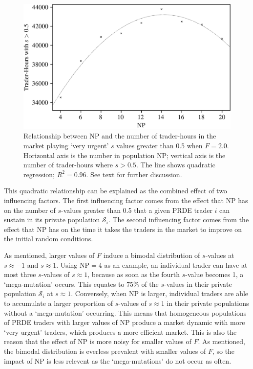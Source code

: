 \documentclass[conference]{IEEEtran}
\begin{document}
\begin{figure}[htbp]
    \centerline{\includegraphics[width=\columnwidth]{f=2.0_strats.png}}
    \caption{
        Relationship between $\mathrm{NP}$ and the number of trader-hours in the market playing `very urgent' $s$ values greater than 0.5 when $F=2.0$.
        Horizontal axis is the number in population $\mathrm{NP}$; vertical axis is the number of trader-hours where $s>0.5$.
        The line shows quadratic regression; $R^2=0.96$.
        See text for further discussion.
    }
    \label{F=2.0_strats}
\end{figure}

This quadratic relationship can be explained as the combined effect of two influencing factors.
The first influencing factor comes from the effect that $\mathrm{NP}$ has on the number of $s$-values greater than 0.5 that a given PRDE trader $i$ can sustain in its private population $\mathcal{S}_i$.
The second influencing factor comes from the effect that $\mathrm{NP}$ has on the time it takes the traders in the market to improve on the initial random conditions.

As mentioned, larger values of $F$ induce a bimodal distribution of $s$-values at $s\approx -1$ and $s\approx 1$.
Using $\mathrm{NP}=\mathrm{4}$ as an example, an individual trader can have at most three $s$-values of $s\approx 1$, because as soon as the fourth $s$-value becomes 1, a `mega-mutation' occurs.
This equates to 75\% of the $s$-values in their private population $\mathcal{S}_i$ at $s\approx 1$.
Conversely, when $\mathrm{NP}$ is larger, individual traders are able to accumulate a larger proportion of $s$-values of $s\approx 1$ in their private populations without a `mega-mutation' occurring.
This means that homogeneous populations of PRDE traders with larger values of $\mathrm{NP}$ produce a market dynamic with more `very urgent' traders, which produces a more efficient market.
This is also the reason that the effect of $\mathrm{NP}$ is more noisy for smaller values of $F$.
As mentioned, the bimodal distribution is everless prevalent with smaller values of $F$, so the impact of $\mathrm{NP}$ is less relevent as the `mega-mutations' do not occur as often.
\end{document}
